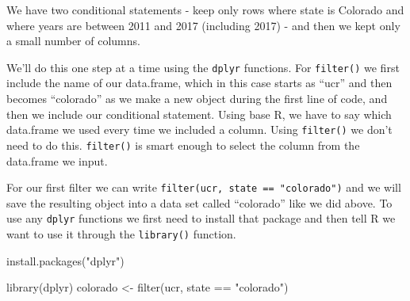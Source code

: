\documentclass[
]{krantz}
\makeatletter
\newenvironment{Shaded}{\begin{snugshade}}{\end{snugshade}}
\newcommand{\DecValTok}[1]{\textcolor[rgb]{0.06,0.06,0.06}{#1}}
\newcommand{\FunctionTok}[1]{\textcolor[rgb]{0,0,0}{#1}}
\newcommand{\NormalTok}[1]{#1}
\newcommand{\OtherTok}[1]{\textcolor[rgb]{0.37,0.37,0.37}{#1}}
\newcommand{\SpecialCharTok}[1]{\textcolor[rgb]{0,0,0}{#1}}
\newcommand{\StringTok}[1]{\textcolor[rgb]{0.5,0.5,0.5}{#1}}
\newenvironment{kframe}{%
\medskip{}
\setlength{\fboxsep}{.8em}
 \def\at@end@of@kframe{}%
 \ifinner\ifhmode%
  \def\at@end@of@kframe{\end{minipage}}%
  \begin{minipage}{\columnwidth}%
 \fi\fi%
 \def\FrameCommand##1{\hskip\@totalleftmargin \hskip-\fboxsep
 \colorbox{shadecolor}{##1}\hskip-\fboxsep
     \hskip-\linewidth \hskip-\@totalleftmargin \hskip\columnwidth}%
 \MakeFramed {\advance\hsize-\width
   \@totalleftmargin\z@ \linewidth\hsize
   \@setminipage}}%
 {\par\unskip\endMakeFramed%
 \at@end@of@kframe}
\renewenvironment{Shaded}{\begin{kframe}}{\end{kframe}}
\makeatother
\begin{document}
\begin{Shaded}
\end{Shaded}

We have two conditional statements - keep only rows where
state is Colorado and where years are between 2011 and 2017
(including 2017) - and then we kept only a small number of
columns.

We'll do this one step at a time using the \texttt{dplyr}
functions. For \texttt{filter()} we first include the name
of our data.frame, which in this case starts as ``ucr'' and
then becomes ``colorado'' as we make a new object during the
first line of code, and then we include our conditional
statement. Using base R, we have to say which data.frame we
used every time we included a column. Using
\texttt{filter()} we don't need to do this.
\texttt{filter()} is smart enough to select the column from
the data.frame we input.

For our first filter we can write
\texttt{filter(ucr,\ state\ ==\ "colorado")} and we will
save the resulting object into a data set called
``colorado'' like we did above. To use any \texttt{dplyr}
functions we first need to install that package and then
tell R we want to use it through the \texttt{library()}
function.

\begin{Shaded}
\begin{Highlighting}[]
\FunctionTok{install.packages}\NormalTok{(}\StringTok{"dplyr"}\NormalTok{)}
\end{Highlighting}
\end{Shaded}

\begin{Shaded}
\begin{Highlighting}[]
\FunctionTok{library}\NormalTok{(dplyr)}
\NormalTok{colorado }\OtherTok{\textless{}{-}} \FunctionTok{filter}\NormalTok{(ucr, state }\SpecialCharTok{==} \StringTok{"colorado"}\NormalTok{)}
\end{Highlighting}
\end{Shaded}
\end{document}
